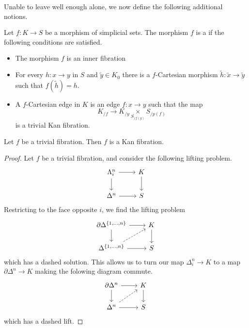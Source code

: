 \documentclass[main.tex]{subfiles}
\begin{document}
Unable to leave well enough alone, we now define the following additional notions.

\begin{definition}
  \label{def:cartesian_fibration}
  Let $f\colon K \to S$ be a morphism of simplicial sets. The morphism $f$ is a  if the following conditions are satisfied.
  \begin{itemize}
    \item The morphism $f$ is an inner fibration

    \item For every $h\colon x \to y$ in $S$ and $\tilde{y} \in K_{0}$ there is a $f$-Cartesian morphism $\tilde{h}\colon \tilde{x} \to \tilde{y}$ such that $f(\tilde{h}) = h$.

    \item A $f$-Cartesian edge in $K$ is an edge $f\colon x \to y$ such that the map
      \begin{equation*}
        K_{/f} \to K_{/y} \underset{S_{/f(y)}}{\times} S_{/p(f)}
      \end{equation*}
      is a trivial Kan fibration.
  \end{itemize}
\end{definition}

\begin{theorem}
  Let $f$ be a trivial fibration. Then $f$ is a Kan fibration.
\end{theorem}
\begin{proof}
  Let $f$ be a trivial fibration, and consider the following lifting problem.
  \begin{equation*}
    \begin{tikzcd}
      \Lambda^{n}_{i}
      \arrow[r]
      \arrow[d]
      & K
      \arrow[d]
      \\
      \Delta^{n}
      \arrow[r]
      & S
    \end{tikzcd}
  \end{equation*}
  Restricting to the face opposite $i$, we find the lifting problem
  \begin{equation*}
    \begin{tikzcd}
      \partial \Delta^{\{1, \ldots, n\}}
      \arrow[r]
      \arrow[d]
      & K
      \arrow[d]
      \\
      \Delta^{\{1, \ldots, n\}}
      \arrow[r]
      \arrow[ur, dashed]
      & S
    \end{tikzcd}
  \end{equation*}
  which has a dashed solution. This allows us to turn our map $\Delta^{n}_{i} \to K$ to a map $\partial \Delta^{n} \to K$ making the folowing diagram commute.
  \begin{equation*}
    \begin{tikzcd}
      \partial \Delta^{n}
      \arrow[r]
      \arrow[d]
      & K
      \arrow[d]
      \\
      \Delta^{n}
      \arrow[r]
      \arrow[ur, dashed]
      & S
    \end{tikzcd}
  \end{equation*}
  which has a dashed lift.
\end{proof}
\end{document}
